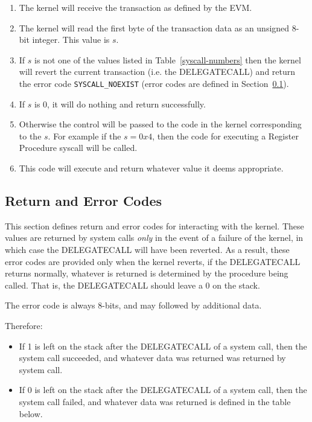 \documentclass[english,a4paper]{article}
\begin{document}
\begin{enumerate}
  \item The kernel will receive the transaction as defined by the EVM.
  \item The kernel will read the first byte of the transaction data as an
  unsigned 8-bit integer. This value is $s$.
  \item If $s$ is not one of the values listed in Table~\ref{syscall-numbers}
  then the kernel will revert the current transaction (i.e. the DELEGATECALL)
  and return the error code \texttt{SYSCALL\_NOEXIST} (error codes are defined
  in Section~\ref{errors}).
  \item If $s$ is 0, it will do nothing and return successfully.
  \item Otherwise the control will be passed to the code in the kernel
  corresponding to the $s$. For example if the $s = 0x4$, then the code for
  executing a Register Procedure syscall will be called.
  \item This code will execute and return whatever value it deems appropriate.
\end{enumerate}

\subsection{Return and Error Codes}\label{errors}
This section defines return and error codes for interacting with the kernel.
These values are returned by system calls \emph{only} in the event of a failure
of the kernel, in which case the DELEGATECALL will have been reverted. As a
result, these error codes are provided only when the kernel reverts, if the
DELEGATECALL returns normally, whatever is returned is determined by the
procedure being called. That is, the DELEGATECALL should leave a 0 on the stack.

The error code is always 8-bits, and may followed by additional data.

Therefore:

\begin{itemize}
  \item If 1 is left on the stack after the DELEGATECALL of a system call, then
  the system call succeeded, and whatever data was returned was returned by
  system call.
  \item If 0 is left on the stack after the DELEGATECALL of a system call, then
  the system call failed, and whatever data was returned is defined in the table
  below.
\end{itemize}
\end{document}
